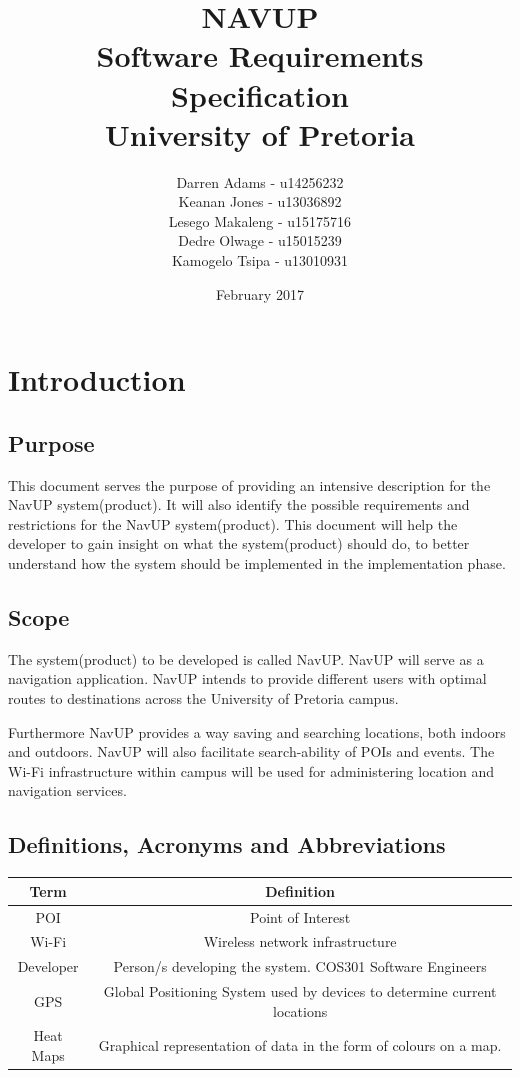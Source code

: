 \documentclass{article}
\title{NAVUP\\ Software Requirements Specification\\ University of Pretoria}
\author{Darren Adams\hspace{2 cm} - u14256232\\ Keanan Jones\hspace{2 cm} - u13036892\\ Lesego Makaleng\hspace{2 cm} - u15175716\\ Dedre Olwage\hspace{2 cm} - u15015239\\ Kamogelo Tsipa\hspace{2 cm} - u13010931 }
\date{February 2017}
\begin{document}
\maketitle
\pagebreak
\tableofcontents
\pagebreak
\section{Introduction}
    \subsection{Purpose}
		\begin{flushleft}
			This document serves the purpose of providing an intensive description for the NavUP system(product). It will also identify the possible requirements and restrictions for the NavUP system(product). This document will help the developer to gain insight on what the system(product) should do, to better understand how the system should be implemented in the implementation phase.
		\end{flushleft}
    \subsection{Scope}
		\begin{flushleft}
			The system(product) to be developed is called NavUP. NavUP will serve as a navigation application. NavUP intends to provide different users with optimal routes to destinations across the University of Pretoria campus.
			
			Furthermore NavUP provides a way saving and searching locations, both indoors and outdoors. NavUP will also facilitate search-ability of POIs and events. The Wi-Fi infrastructure within campus will be used for administering location and navigation services.
		\end{flushleft}
    \subsection{Definitions, Acronyms and Abbreviations}
        \begin{table}[h!]
            \centering
            \begin{tabular}{|c|c|}
            \hline
            Term & Definition \\
            \hline
            POI & Point of Interest \\
            \hline
            Wi-Fi & Wireless network infrastructure \\
            \hline
            Developer & Person/s developing the system. COS301 Software Engineers
            \\
            \hline
            GPS & Global Positioning System used by devices to determine current locations
            \\
            \hline
            Heat Maps & Graphical representation of data in the form of colours on a map.
            \\
            \hline
            \end{tabular}
        \end{table}
\end{document}
